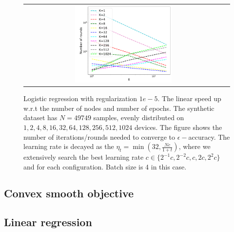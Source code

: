\begin{figure}[h!]
\begin{tabular}{cc}
\includegraphics[width=0.5\textwidth]{fig/E1-4-16speedupEpochsRounds-w8a-epsilon013-b4-reg1e-05-adapt0.pdf} \\
\end{tabular}
	\caption{Logistic regression with regularization $1e-5$. The linear speed up w.r.t the number of nodes and number of epochs. The synthetic dataset has $N=49749$ samples, evenly distributed on $1, 2, 4, 8, 16, 32, 64, 128, 256, 512, 1024$ devices. The figure shows the number of iterations/rounds needed to converge to $\epsilon-$accuracy. The learning rate is decayed as the $\eta_t = \min(32, \frac{Nc}{1 + t})$, where we extensively search the best learning rate $c \in \{2^{-1}c, 2^{-2}c, c, 2c, 2^{2}c\}$ and for each configuration. Batch size is 4 in this case.}
\end{figure}



\subsection{Convex smooth objective}






\subsection{Linear regression}





